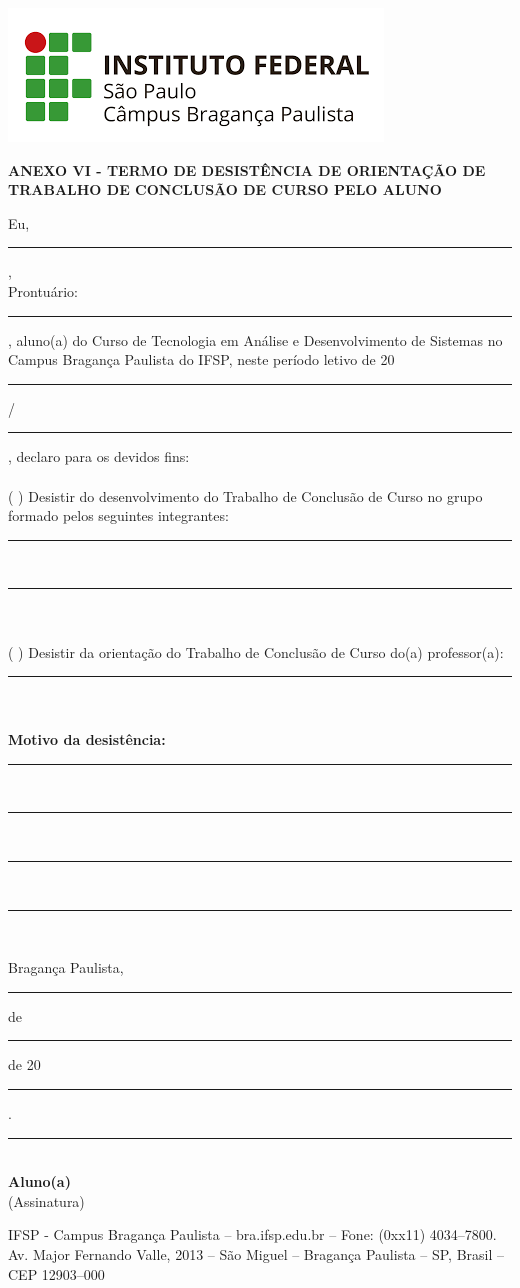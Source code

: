\documentclass[12pt,a4paper]{report}
\newcommand{\cabecalho}{ANEXO VI - TERMO DE DESISTÊNCIA DE ORIENTAÇÃO DE TRABALHO DE CONCLUSÃO DE CURSO PELO ALUNO}
\begin{document}
	\includegraphics[scale=0.35]{IFSP-BRA.png}
\hline
    \vspace{1cm}
	\begin{center}
		{\large\textbf{\cabecalho}}\\
	\end{center}
	
	\vspace{1cm}

    	\noindent Eu, \rule{16cm}{0.1pt}, \\ Prontuário: \rule{3cm}{0.1pt}, aluno(a) do Curso de Tecnologia em Análise e Desenvolvimento de Sistemas no Campus Bragança Paulista do IFSP, neste período letivo de 20\rule{1cm}{0.1pt} \hspace{0.01cm}/\rule{1cm}{0.1pt} \hspace{0.01cm}, declaro para os devidos fins: \\
    	\\
    	\noindent (  \hspace{0.3cm}) Desistir do desenvolvimento do Trabalho de Conclusão de Curso no grupo formado pelos seguintes integrantes:   \\
    	\rule{17cm}{0.1pt} \\
    	\rule{17cm}{0.1pt} \\
    	\\
    	\noindent ( \hspace{0.3cm} ) Desistir da orientação do Trabalho de Conclusão de Curso do(a) professor(a): 	 \\
    	\rule{17cm}{0.1pt} \\
    	\\
        \noindent \textbf{Motivo da desistência:} \rule{12.3cm}{0.1pt} \\
    	\rule{17cm}{0.1pt} \\
    	\rule{17cm}{0.1pt} \\
        \rule{17cm}{0.1pt} \\
    
    \begin{center}
        {Bragança Paulista, \rule{1cm}{0.1pt} de \rule{5cm}{0.1pt} de 20\rule{1cm}{0.1pt}.}
	\end{center}
	\vspace{2cm}
	\begin{table}[ht]
		\centering \rule{10cm}{0.1pt}               
		\\ \small{\textbf{Aluno(a)}}
		\\ \small{(Assinatura)}
	\end{table}

    \vspace{2cm}
    \hline 
	\vspace{0.2cm}
	\centering \tiny{IFSP - Campus Bragança Paulista – bra.ifsp.edu.br – Fone: (0xx11) 4034–7800.
Av. Major Fernando Valle, 2013 – São Miguel – Bragança Paulista – SP, Brasil – CEP 12903–000}
\end{document}
